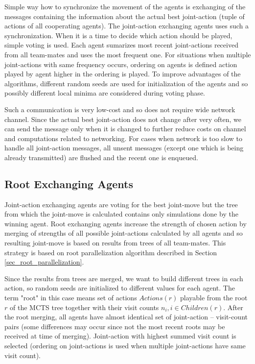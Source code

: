 Simple way how to synchronize the movement of the agents is exchanging of the messages
containing the information about the actual best joint-action (tuple of actions of all
cooperating agents). The joint-action exchanging agents uses such a synchronization. When it is
a time to decide which action should be played, simple voting is used. Each agent sumarizes
most recent joint-actions received from all team-mates and uses the most frequent one. For
situations when multiple joint-actions with same frequency occurs, ordering on agents is
defined action played by agent higher in the ordering is played. To improve advantages of the
algorithms, different random seeds are used for initialization of the agents and so possibly
different local minima are considered during voting phase.

Such a communication is very low-cost and so does not require wide network channel. Since the
actual best joint-action does not change after very often, we can send the message only when it
is changed to further reduce costs on channel and computations related to networking. For cases
when network is too slow to handle all joint-action messages, all unsent messages (except one
which is being already transmitted) are flushed and the recent one is enqueued.


\subsection{Root Exchanging Agents}

Joint-action exchanging agents are voting for the best joint-move but the tree from which the
joint-move is calculated contains only simulations done by the winning agent. Root exchanging
agents increase the strength of chosen action by merging of strengths of all possible 
joint-actions calculated by
all agents and so resulting joint-move is based on results from trees of all team-mates. This
strategy is based on root parallelization algorithm described in Section
\ref{sec_root_parallelization}.

Since the results from trees are merged, we want to build different trees in each action, so 
random seeds
are initialized to different values for each agent. The term "root" in this case means set of
actions $Actions(r)$ playable from the root $r$ of the MCTS tree together with their visit
counts $n_i, i \in Children(r)$. After the root merging, all agents have almost identical
set of joint-action -- visit-count pairs (some differences may occur since not the most recent roots
may be received at time of merging). Joint-action with highest summed visit count is
selected (ordering on joint-actions is used when multiple joint-actions have same visit count).

